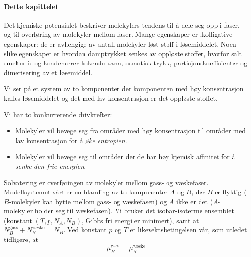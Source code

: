 \paragraph{Dette kapittelet} Det kjemiske potensialet beskriver molekylers tendens til å dele seg opp i faser, og til overføring av molekyler mellom faser. Mange egenskaper er \i{kolligative egenskaper}: de er avhengige av antall molekyler løst stoff i løsemiddelet. Noen slike egenskaper er hvordan damptrykket senkes av oppløste stoffer, hvorfor salt smelter is og kondenserer kokende vann, osmotisk trykk, partisjonskoeffisienter og dimerisering av et løsemiddel.

Vi ser på et system av to komponenter der komponenten med høy konsentrasjon kalles løsemiddelet og det med lav konsentrasjon er det oppløste stoffet.

Vi har to konkurrerende drivkrefter:
\begin{itemize}
	\item Molekyler vil bevege seg fra områder med høy konsentrasjon til områder med lav konsentrasjon for å \emph{øke entropien}.
	\item Molekyler vil bevege seg til områder der de har høy kjemisk affinitet for å \emph{senke den frie energien}.
\end{itemize}

Solvatering er overføringen av molekyler mellom gass- og væskefaser. Modellsystemet vårt er en blanding av to komponenter $A$ og $B$, der $B$ er flyktig ($B$-molekyler kan bytte mellom gass- og væskefasen) og $A$ ikke er det ($A$-molekyler holder seg til væskefasen). Vi bruker det isobar-isoterme ensemblet (konstant $(T,p,N_A,N_B)$, Gibbs fri energi er minimert), samt at $N_B^{\text{gass}}+N_B^{\text{væske}}=N_B$. Ved konstant $p$ og $T$ er likevektsbetingelsen vår, som utledet tidligere, at
\begin{equation}
	\label{muquilibrium}
	\mu_B^{\text{gass}}=\mu_B^{\text{væske}}
\end{equation}

